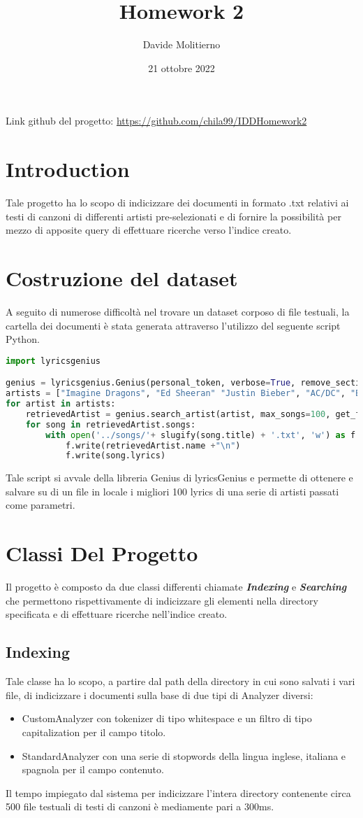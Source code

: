 \documentclass[12pt, letterpaper]{article}
\title{Homework 2}
\author{Davide Molitierno}
\date{21 ottobre 2022}
\begin{document}
\maketitle
Link github del progetto: \url{https://github.com/chila99/IDDHomework2}
\section{Introduction}
Tale progetto ha lo scopo di indicizzare dei documenti in formato .txt relativi ai testi di canzoni di differenti artisti pre-selezionati e di fornire la possibilità per mezzo di apposite query di effettuare ricerche verso l'indice creato.

\section{Costruzione del dataset}
A seguito di numerose difficoltà nel trovare un dataset corposo di file testuali, la cartella dei documenti è stata generata attraverso l'utilizzo del seguente script Python.
\begin{lstlisting}[language=Python]
import lyricsgenius

genius = lyricsgenius.Genius(personal_token, verbose=True, remove_section_headers=True, skip_non_songs=True, retries=5, timeout=120)
artists = ["Imagine Dragons", "Ed Sheeran" "Justin Bieber", "AC/DC", "Bad Bunny", "Beyonce", "Tiziano Ferro"]
for artist in artists:
    retrievedArtist = genius.search_artist(artist, max_songs=100, get_full_info=False)
    for song in retrievedArtist.songs:
        with open('../songs/'+ slugify(song.title) + '.txt', 'w') as f:
            f.write(retrievedArtist.name +"\n")
            f.write(song.lyrics)
\end{lstlisting}
Tale script si avvale della libreria Genius di lyricsGenius e permette di ottenere e salvare su di un file in locale i migliori 100 lyrics di una serie di artisti passati come parametri.
\section{Classi Del Progetto}
Il progetto è composto da due classi differenti chiamate \textbf{\emph{Indexing}} e \textbf{\emph{Searching}} che permettono rispettivamente di indicizzare gli elementi nella directory specificata e di effettuare ricerche nell'indice creato.
\subsection{Indexing}
Tale classe ha lo scopo, a partire dal path della directory in cui sono salvati i vari file, di indicizzare i documenti sulla base di due tipi di Analyzer diversi:
\begin{itemize}
    \item CustomAnalyzer con tokenizer di tipo whitespace e un filtro di tipo capitalization per il campo titolo.
    \item StandardAnalyzer con una serie di stopwords della lingua inglese, italiana e spagnola per il campo contenuto.
\end{itemize} Il tempo impiegato dal sistema per indicizzare l’intera directory contenente circa 500 file testuali di testi di canzoni è mediamente pari a 300ms. 
\end{document}
